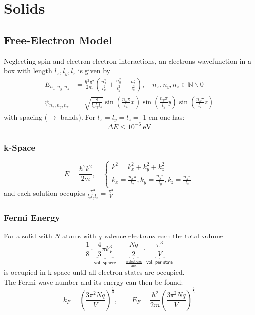 \section{Solids}
\subsection{Free-Electron Model}
Neglecting spin and electron-electron interactions, an electrons wavefunction in a box with length $l_x,l_y,l_z$ is given by
\noindent\begin{align*}
    E_{n_x,n_y,n_z}    & = \frac{\hbar^2\pi^2}{2m}\left(\frac{n_x^2}{l_x^2}+\frac{n_y^2}{l_y^2}+\frac{n_z^2}{l_z^2}\right),\quad n_x,n_y,n_z \in \mathbb{N}\backslash 0 \\
    \psi_{n_x,n_y,n_z} & = \sqrt{\frac{8}{l_x l_y l_z}} \sin\left(\frac{n_x\pi}{l_x}x\right) \sin\left(\frac{n_y\pi}{l_y}y\right) \sin\left(\frac{n_z\pi}{l_z}z\right)
\end{align*}
with spacing ($\to$ bands). For $l_x=l_y=l_z=$ 1 cm one has:
\noindent\begin{equation*}
    \Delta E \leq 10^{-6} ~\mathrm{eV}
\end{equation*}

\subsubsection{k-Space}
\noindent\begin{equation*}
    E = \frac{\hbar^2k^2}{2m}, \quad \begin{cases}
        k^2 = k_x^2+k_y^2+k_z^2 \\
        k_x = \frac{n_x\pi}{l_x}, k_y = \frac{n_y\pi}{l_y}, k_z = \frac{n_z\pi}{l_z}
    \end{cases}
\end{equation*}
and each solution occupies $\frac{\pi^3}{l_x l_y l_z}=\frac{\pi^3}{V}$

\subsubsection{Fermi Energy}
\newpar{}
For a solid with $N$ atoms with $q$ valence electrons each the total volume
\noindent\begin{equation*}
    \frac{1}{8}\cdot\underbrace{\frac{4}{3}\pi k_F^3}_{\textsf{vol. sphere}} = \underbrace{\frac{Nq}{2}}_{\frac{\textsf{\# electrons}}{\mathsf{spin}}}\cdot \underbrace{\frac{\pi^3}{V}}_{\textsf{vol. per state}}
\end{equation*}
is occupied in k-space until all electron states are occupied.\\
The Fermi wave number and its energy can then be found:
\noindent\begin{equation*}
    k_F  = {\left(\frac{3\pi^2 N q}{V}\right)}^{\frac{1}{3}}, \qquad
    E_F  = \frac{\hbar^2}{2m}{\left(\frac{3\pi^2 N q}{V}\right)}^{\frac{2}{3}}
\end{equation*}

